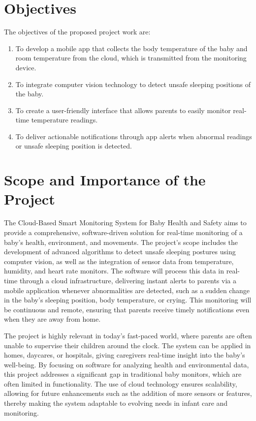 \documentclass[12pt,a4paper]{report}
\begin{document}
\section{Objectives}
The objectives of the proposed project work are:
\begin{enumerate}
    \item To develop a mobile app that collects the body temperature of the baby and room temperature from the cloud, which is transmitted from the monitoring device.
    \item To integrate computer vision technology to detect unsafe sleeping positions of the baby.
    \item To create a user-friendly interface that allows parents to easily monitor real-time temperature readings.
    \item To deliver actionable notifications through app alerts when abnormal readings or unsafe sleeping position is detected.
\end{enumerate}
\section{Scope and Importance of the Project}
The Cloud-Based Smart Monitoring System for Baby Health and Safety aims to provide a comprehensive, software-driven solution for real-time monitoring of a baby’s health, environment, and movements. The project’s scope includes the development of advanced algorithms to detect unsafe sleeping postures using computer vision, as well as the integration of sensor data from temperature, humidity, and heart rate monitors. The software will process this data in real-time through a cloud infrastructure, delivering instant alerts to parents via a mobile application whenever abnormalities are detected, such as a sudden change in the baby’s sleeping position, body temperature, or crying. This monitoring will be continuous and remote, ensuring that parents receive timely notifications even when they are away from home.

The project is highly relevant in today's fast-paced world, where parents are often unable to supervise their children around the clock. The system can be applied in homes, daycares, or hospitals, giving caregivers real-time insight into the baby’s well-being. By focusing on software for analyzing health and environmental data, this project addresses a significant gap in traditional baby monitors, which are often limited in functionality. The use of cloud technology ensures scalability, allowing for future enhancements such as the addition of more sensors or features, thereby making the system adaptable to evolving needs in infant care and monitoring.
\end{document}

